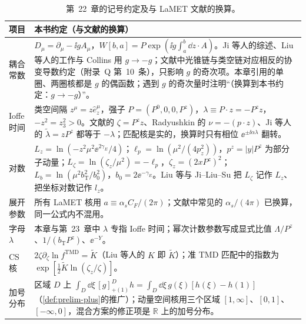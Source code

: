 \begin{table}[htbp]
\centering
\small
\renewcommand{\arraystretch}{1.12}
\begin{tabularx}{\textwidth}{@{}p{2.3cm}X@{}}
\toprule
项目 & 本书约定（与文献的换算） \\
\midrule
耦合常数 & $D_\mu=\partial_\mu-\ii gA_\mu$，$W[b,a]=P\exp(\ii g\int_a^b\dd z\cdot A)$。Ji 等人的综述\cite{JiEtAl2021}、Liu 等人的工作与 Collins 用 $g\to-g$；文献\cite{IzubuchiEtAl2018}中光锥链与类空链对应相反的协变导数约定（附录~Q 第~10~条），只影响 $g$ 的奇次项。本章引用的单圈、两圈核都是 $g$ 的偶函数；遇到 $g$ 的奇次量时注明“（换算到本书约定：$g\to-g$）”。 \\
Ioffe 时间 & 类空间隔 $z^\mu=z\hat e_z^\mu$，强子 $P=(P^0,0,0,P^z)$，$\lambda\equiv P\cdot z=-P^zz$，$-z^2=z_3^2>0$。文献\cite{IzubuchiEtAl2018}的 $\zeta=P^zz$、Radyushkin 的 $\nu=-(p\cdot z)$、Ji 等人的 $\tilde\lambda=zP^z$ 都等于 $-\lambda$；匹配核是实的，换算时只有相位 $\ee^{\pm\ii\alpha\lambda}$ 翻转。 \\
对数 & $L_z=\ln(-z^2\mu^2\ee^{2\gamma_E}/4)$；$\ell_p=\ln(\mu^2/(4p_z^2))$，$p^z=|y|P^z$ 为部分子动量；$L_\zeta=\ln(\zeta_z/\mu^2)=-\ell_p$，$\zeta_z=(2xP^z)^2$；$L_b=\ln(\mu^2b_{\mathrm T}^2/b_0^2)$，$b_0=2\ee^{-\gamma_E}$。Liu 等与 Ji--Liu--Su 把 $L_\zeta$ 记作 $L_z$、把坐标对数记作 $l_z$。 \\
展开参数 & 所有 LaMET 核用 $a\equiv\alpha_sC_F/(2\pi)$；文献中常见的 $\alpha_s/(4\pi)$ 已换算，同一公式内不混用。 \\
字母 $\lambda$ & 本章与第~23~章中 $\lambda$ 专指 Ioffe 时间；幂次计数参数写成显式比值 $\Lambda/P^z$、$1/(b_{\mathrm T}P^z)$、$\ee^{-Y}$。 \\
CS 核 & $2\zeta\partial_\zeta\ln f^{\mathrm{TMD}}=\tilde K$（Liu 等人的 $K$ 即 $\tilde K$）；准 TMD 匹配中的指数为 $\exp[\frac12\tilde K\ln(\zeta_z/\zeta)]$。 \\
加号分布 & 区域 $D$ 上 $\int_D\dd\xi\,[g]^D_{+(1)}h=\int_D\dd\xi\,g(\xi)[h(\xi)-h(1)]$（\cref{def:prelim-plus}的推广）；动量空间核用三个区域 $[1,\infty]$、$[0,1]$、$[-\infty,0]$，混合方案的修正项是 $\mathbb R$ 上的加号分布。 \\
\bottomrule
\end{tabularx}
\caption{第~22~章的记号约定及与 LaMET 文献的换算。}
\label{tab:lamet-conventions}
\end{table}

